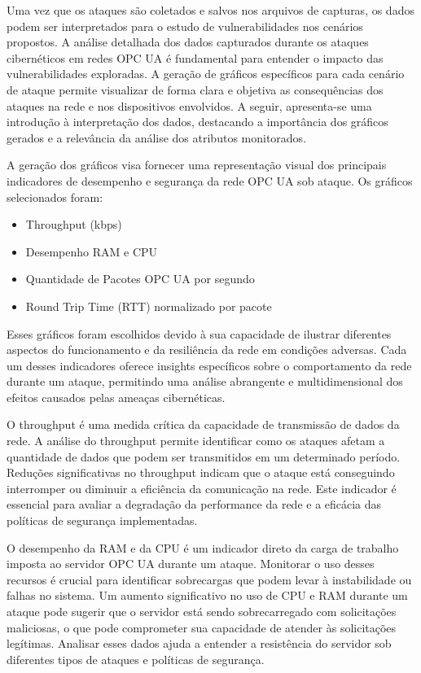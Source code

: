     { \color{red} Uma vez que os ataques são coletados e salvos nos arquivos de capturas, os dados podem ser interpretados para o estudo de vulnerabilidades nos cenários propostos. A análise detalhada dos dados capturados durante os ataques cibernéticos em redes OPC UA é fundamental para entender o impacto das vulnerabilidades exploradas. A geração de gráficos específicos para cada cenário de ataque permite visualizar de forma clara e objetiva as consequências dos ataques na rede e nos dispositivos envolvidos. A seguir, apresenta-se uma introdução à interpretação dos dados, destacando a importância dos gráficos gerados e a relevância da análise dos atributos monitorados.

    A geração dos gráficos visa fornecer uma representação visual dos principais indicadores de desempenho e segurança da rede OPC UA sob ataque. Os gráficos selecionados foram:

    \begin{itemize}
        \item Throughput (kbps)
        \item Desempenho RAM e CPU
        \item Quantidade de Pacotes OPC UA por segundo
        \item Round Trip Time (RTT) normalizado por pacote
    \end{itemize}
    
    Esses gráficos foram escolhidos devido à sua capacidade de ilustrar diferentes aspectos do funcionamento e da resiliência da rede em condições adversas. Cada um desses indicadores oferece insights específicos sobre o comportamento da rede durante um ataque, permitindo uma análise abrangente e multidimensional dos efeitos causados pelas ameaças cibernéticas.

    O throughput é uma medida crítica da capacidade de transmissão de dados da rede. A análise do throughput permite identificar como os ataques afetam a quantidade de dados que podem ser transmitidos em um determinado período. Reduções significativas no throughput indicam que o ataque está conseguindo interromper ou diminuir a eficiência da comunicação na rede. Este indicador é essencial para avaliar a degradação da performance da rede e a eficácia das políticas de segurança implementadas.

    O desempenho da RAM e da CPU é um indicador direto da carga de trabalho imposta ao servidor OPC UA durante um ataque. Monitorar o uso desses recursos é crucial para identificar sobrecargas que podem levar à instabilidade ou falhas no sistema. Um aumento significativo no uso de CPU e RAM durante um ataque pode sugerir que o servidor está sendo sobrecarregado com solicitações maliciosas, o que pode comprometer sua capacidade de atender às solicitações legítimas. Analisar esses dados ajuda a entender a resistência do servidor sob diferentes tipos de ataques e políticas de segurança.

}
